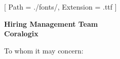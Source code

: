 


\renewcommand{\photo}[2]{}

\ifmonochrome
  \renewcommand{\marginpar}[1]{}
\fi

\geometry{
  left=2cm,
  right=2cm,
  top=2cm,
  bottom=2cm,
  portrait
}

\setmainfont{NotoSans-Regular}[
  Path = ./fonts/,
  Extension = .ttf
]



\makecvheader

\vspace{1cm}
\indent\textbf{Hiring Management Team}\\
\indent\textbf{Coralogix}

\vspace{0.5cm}

\noindent To whom it may concern:

\vspace{0.5cm}

\justifying

